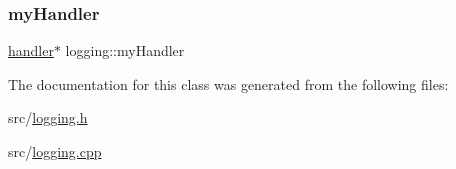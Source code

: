 \subsubsection{\texorpdfstring{my\+Handler}{myHandler}}
{\footnotesize\ttfamily \hyperlink{classhandler}{handler}$\ast$ logging\+::my\+Handler\hspace{0.3cm}{\ttfamily [private]}}



The documentation for this class was generated from the following files\+:\begin{DoxyCompactItemize}
\item 
src/\hyperlink{logging_8h}{logging.\+h}\item 
src/\hyperlink{logging_8cpp}{logging.\+cpp}\end{DoxyCompactItemize}
